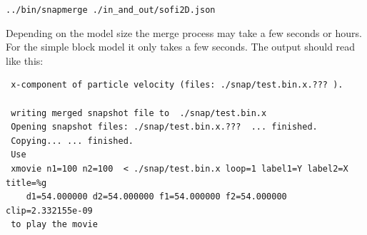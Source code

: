 \documentclass[11pt,onecolumn,oneside]{article}
\begin{document}
\texttt{../bin/snapmerge ./in\_and\_out/sofi2D.json }

Depending on the model size the merge process may take a few seconds or hours. For the simple block model it only takes a few seconds. The output should read like this:

\begin{verbatim}
 x-component of particle velocity (files: ./snap/test.bin.x.??? ).

 writing merged snapshot file to  ./snap/test.bin.x
 Opening snapshot files: ./snap/test.bin.x.???  ... finished.
 Copying... ... finished.
 Use
 xmovie n1=100 n2=100  < ./snap/test.bin.x loop=1 label1=Y label2=X title=%g 
    d1=54.000000 d2=54.000000 f1=54.000000 f2=54.000000 clip=2.332155e-09
 to play the movie
\end{verbatim} 

%
\newpage


\end{document}
